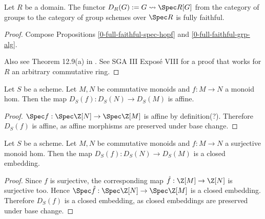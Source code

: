 \begin{theorem}
  \label{0-full-faithful-diag}
  \lean{}
  \leanok

  Let $R$ be a domain.
  The functor $D_R(G) := G \rightsquigarrow \Spec R[G]$ from the category of groups to the category of group schemes over $\Spec R$ is fully faithful.
\end{theorem}
\begin{proof}
  \leanok

  Compose Propositions \ref{0-full-faithful-spec-hopf} and \ref{0-full-faithful-grp-alg}.

  Also see Theorem 12.9(a) in \cite{Milne_2017}. See SGA III Exposé VIII for a proof that works for $R$ an arbitrary commutative ring.
\end{proof}


\begin{proposition}
  \label{0-diag-aff-hom}

  Let $S$ be a scheme.
  Let $M, N$ be commutative monoids and $f : M \to N$ a monoid hom.
  Then the map $D_S(f) : D_S(N) \to D_S(M)$ is affine.
\end{proposition}
\begin{proof}
  \uses{}

  $\Spec f : \Spec \Z[N] \to \Spec \Z[M]$ is affine by definition(?).
  Therefore $D_S(f)$ is affine, as affine morphisms are preserved under base change.
\end{proof}


\begin{proposition}
  \label{0-diag-closed-emb}

  Let $S$ be a scheme.
  Let $M, N$ be commutative monoids and $f : M \to N$ a surjective monoid hom.
  Then the map $D_S(f) : D_S(N) \to D_S(M)$ is a closed embedding.
\end{proposition}
\begin{proof}
  \uses{}

  Since $f$ is surjective, the corresponding map $\hat f : \Z[M] \to \Z[N]$ is surjective too.
  Hence $\Spec \hat f : \Spec \Z[N] \to \Spec \Z[M]$ is a closed embedding.
  Therefore $D_S(f)$ is a closed embedding, as closed embeddings are preserved under base change.
\end{proof}


